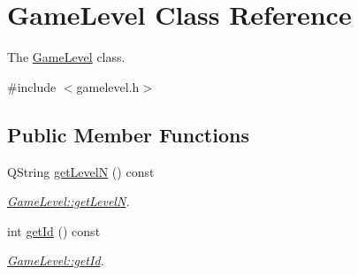 \hypertarget{class_game_level}{}\section{Game\+Level Class Reference}
\label{class_game_level}


The \hyperlink{class_game_level}{Game\+Level} class.  




{\ttfamily \#include $<$gamelevel.\+h$>$}

\subsection*{Public Member Functions}
\begin{DoxyCompactItemize}
\item 
Q\+String \hyperlink{class_game_level_acab80c7bfab374236d1a5bd55a10ff7e}{get\+Level\+N} () const 
\begin{DoxyCompactList}\small\item\em \hyperlink{class_game_level_acab80c7bfab374236d1a5bd55a10ff7e}{Game\+Level\+::get\+Level\+N}. \end{DoxyCompactList}\item 
int \hyperlink{class_game_level_a5e06760f7b73f987f6fbb42f9a7ff89f}{get\+Id} () const 
\begin{DoxyCompactList}\small\item\em \hyperlink{class_game_level_a5e06760f7b73f987f6fbb42f9a7ff89f}{Game\+Level\+::get\+Id}. \end{DoxyCompactList}\end{DoxyCompactItemize}
